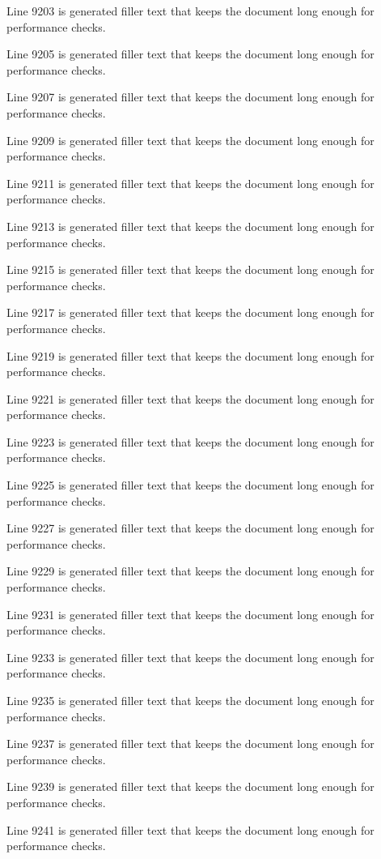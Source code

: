 Line 9203 is generated filler text that keeps the document long enough for performance checks.

Line 9205 is generated filler text that keeps the document long enough for performance checks.

Line 9207 is generated filler text that keeps the document long enough for performance checks.

Line 9209 is generated filler text that keeps the document long enough for performance checks.

Line 9211 is generated filler text that keeps the document long enough for performance checks.

Line 9213 is generated filler text that keeps the document long enough for performance checks.

Line 9215 is generated filler text that keeps the document long enough for performance checks.

Line 9217 is generated filler text that keeps the document long enough for performance checks.

Line 9219 is generated filler text that keeps the document long enough for performance checks.

Line 9221 is generated filler text that keeps the document long enough for performance checks.

Line 9223 is generated filler text that keeps the document long enough for performance checks.

Line 9225 is generated filler text that keeps the document long enough for performance checks.

Line 9227 is generated filler text that keeps the document long enough for performance checks.

Line 9229 is generated filler text that keeps the document long enough for performance checks.

Line 9231 is generated filler text that keeps the document long enough for performance checks.

Line 9233 is generated filler text that keeps the document long enough for performance checks.

Line 9235 is generated filler text that keeps the document long enough for performance checks.

Line 9237 is generated filler text that keeps the document long enough for performance checks.

Line 9239 is generated filler text that keeps the document long enough for performance checks.

Line 9241 is generated filler text that keeps the document long enough for performance checks.


